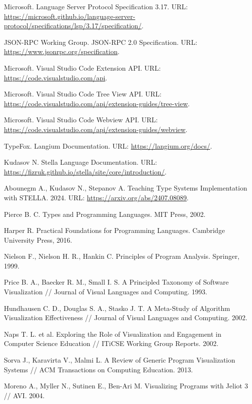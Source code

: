 ﻿\documentclass[14pt,a4paper]{extarticle}
\begin{document}
\begin{enumerate}[label={[\arabic*]},leftmargin=*,itemsep=0pt,topsep=0pt]
\item Microsoft. Language Server Protocol Specification 3.17. URL: \url{https://microsoft.github.io/language-server-protocol/specifications/lsp/3.17/specification/}.
\item JSON-RPC Working Group. JSON-RPC 2.0 Specification. URL: \url{https://www.jsonrpc.org/specification}.
\item Microsoft. Visual Studio Code Extension API. URL: \url{https://code.visualstudio.com/api}.
\item Microsoft. Visual Studio Code Tree View API. URL: \url{https://code.visualstudio.com/api/extension-guides/tree-view}.
\item Microsoft. Visual Studio Code Webview API. URL: \url{https://code.visualstudio.com/api/extension-guides/webview}.
\item TypeFox. Langium Documentation. URL: \url{https://langium.org/docs/}.
\item Kudasov N. Stella Language Documentation. URL: \url{https://fizruk.github.io/stella/site/core/introduction/}.
\item Abounegm A., Kudasov N., Stepanov A. Teaching Type Systems Implementation with STELLA. 2024. URL: \url{https://arxiv.org/abs/2407.08089}.
\item Pierce B. C. Types and Programming Languages. MIT Press, 2002.
\item Harper R. Practical Foundations for Programming Languages. Cambridge University Press, 2016.
\item Nielson F., Nielson H. R., Hankin C. Principles of Program Analysis. Springer, 1999.
\item Price B. A., Baecker R. M., Small I. S. A Principled Taxonomy of Software Visualization // Journal of Visual Languages and Computing. 1993.
\item Hundhausen C. D., Douglas S. A., Stasko J. T. A Meta-Study of Algorithm Visualization Effectiveness // Journal of Visual Languages and Computing. 2002.
\item Naps T. L. et al. Exploring the Role of Visualization and Engagement in Computer Science Education // ITiCSE Working Group Reports. 2002.
\item Sorva J., Karavirta V., Malmi L. A Review of Generic Program Visualization Systems // ACM Transactions on Computing Education. 2013.
\item Moreno A., Myller N., Sutinen E., Ben-Ari M. Visualizing Programs with Jeliot 3 // AVI. 2004.

\end{enumerate}
\end{document}
